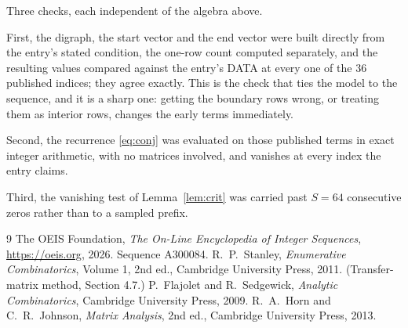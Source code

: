 \documentclass[11pt,a4paper]{article}
\theoremstyle{plain}
\theoremstyle{definition}
\begin{document}
Three checks, each independent of the algebra above.

First, the digraph, the start vector and the end vector were built directly from the
entry's stated condition, the one-row count computed separately, and the resulting values
compared against the entry's DATA at every one of the $36$ published indices; they
agree exactly. This is the check that ties the model to the sequence, and it is a sharp one:
getting the boundary rows wrong, or treating them as interior rows, changes the early terms
immediately.

Second, the recurrence \eqref{eq:conj} was evaluated on those published terms in exact
integer arithmetic, with no matrices involved, and vanishes at every index the entry claims.

Third, the vanishing test of Lemma~\ref{lem:crit} was carried past $S=64$ consecutive
zeros rather than to a sampled prefix.

\begin{thebibliography}{9}
 The OEIS Foundation, \emph{The On-Line Encyclopedia of Integer
Sequences}, \url{https://oeis.org}, 2026. Sequence A300084.
 R.~P.~Stanley, \emph{Enumerative Combinatorics}, Volume 1, 2nd ed.,
Cambridge University Press, 2011. (Transfer-matrix method, Section 4.7.)
 P.~Flajolet and R.~Sedgewick, \emph{Analytic Combinatorics}, Cambridge
University Press, 2009.
 R.~A.~Horn and C.~R.~Johnson, \emph{Matrix Analysis}, 2nd ed., Cambridge
University Press, 2013.
\end{thebibliography}
\end{document}

